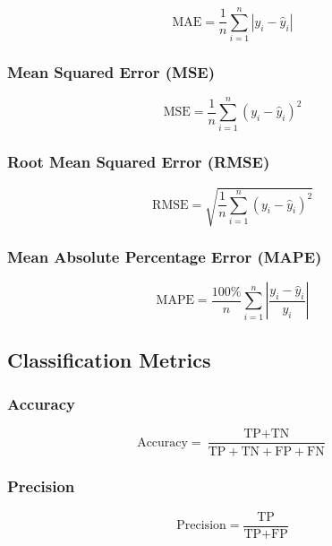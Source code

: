 \documentclass[12pt,a4paper]{article}
\begin{document}
\begin{equation}
\text{MAE} = \frac{1}{n} \sum_{i=1}^{n} |y_i - \hat{y}_i|
\end{equation}

\subsubsection{Mean Squared Error (MSE)}

\begin{equation}
\text{MSE} = \frac{1}{n} \sum_{i=1}^{n} (y_i - \hat{y}_i)^2
\end{equation}

\subsubsection{Root Mean Squared Error (RMSE)}

\begin{equation}
\text{RMSE} = \sqrt{\frac{1}{n} \sum_{i=1}^{n} (y_i - \hat{y}_i)^2}
\end{equation}

\subsubsection{Mean Absolute Percentage Error (MAPE)}

\begin{equation}
\text{MAPE} = \frac{100\%}{n} \sum_{i=1}^{n} \left|\frac{y_i - \hat{y}_i}{y_i}\right|
\end{equation}

\subsection{Classification Metrics}

\subsubsection{Accuracy}

\begin{equation}
\text{Accuracy} = \frac{\text{TP} + \text{TN}}{\text{TP} + \text{TN} + \text{FP} + \text{FN}}
\end{equation}

\subsubsection{Precision}

\begin{equation}
\text{Precision} = \frac{\text{TP}}{\text{TP} + \text{FP}}
\end{equation}
\end{document}
